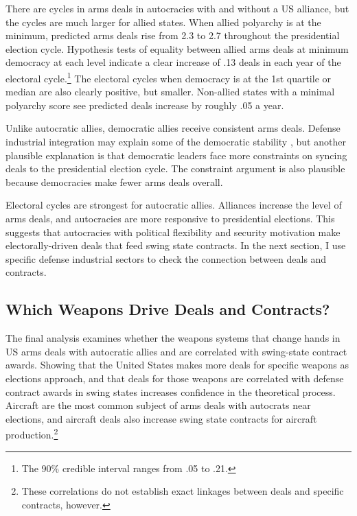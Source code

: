 \documentclass[12pt]{article}
\begin{document}
There are cycles in arms deals in autocracies with and without a US alliance, but the cycles are much larger for allied states. 
When allied polyarchy is at the minimum, predicted arms deals rise from 2.3 to 2.7 throughout the presidential election cycle.
Hypothesis tests of equality between allied arms deals at minimum democracy at each level indicate a clear increase of .13 deals in each year of the electoral cycle.\footnote{The 90\% credible interval ranges from .05 to .21.}
The electoral cycles when democracy is at the 1st quartile or median are also clearly positive, but smaller.
Non-allied states with a minimal polyarchy score see predicted deals increase by roughly .05 a year.


Unlike autocratic allies, democratic allies receive consistent arms deals. 
Defense industrial integration may explain some of the democratic stability \citep{Brooks2005}, but another plausible explanation is that democratic leaders face more constraints on syncing deals to the presidential election cycle.
The constraint argument is also plausible because democracies make fewer arms deals overall. 


Electoral cycles are strongest for autocratic allies. 
Alliances increase the level of arms deals, and autocracies are more responsive to presidential elections. 
This suggests that autocracies with political flexibility and security motivation make electorally-driven deals that feed swing state contracts. 
In the next section, I use specific defense industrial sectors to check the connection between deals and contracts. 



\subsection{Which Weapons Drive Deals and Contracts?} 


The final analysis examines whether the weapons systems that change hands in US arms deals with autocratic allies and are correlated with swing-state contract awards. 
Showing that the United States makes more deals for specific weapons as elections approach, and that deals for those weapons are correlated with defense contract awards in swing states increases confidence in the theoretical process. 
Aircraft are the most common subject of arms deals with autocrats near elections, and aircraft deals also increase swing state contracts for aircraft production.\footnote{These correlations do not establish exact linkages between deals and specific contracts, however.}
\end{document}
